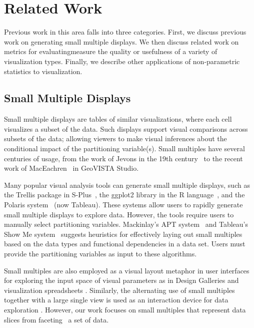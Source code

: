 \section{Related Work}
\label{sec:related}
Previous work in this area falls into three categories. First, we discuss previous work on generating small multiple displays. We then discuss related work on metrics for evaluatingmeasure the quality or usefulness of a variety of visualization types. Finally, we describe other applications of non-parametric statistics to visualization.

\subsection{Small Multiple Displays}
Small multiple displays are tables of similar visualizations, where each cell visualizes a subset of the data. Such displays support visual comparisons across subsets of the data; allowing viewers to make visual inferences about the conditional impact of the partitioning variable(s). Small multiples have several centuries of usage, from the work of Jevons in the 19th century~\cite{Kelley1973} to the recent work of MacEachren~\cite{Maceachren2003} in GeoVISTA Studio.

Many popular visual analysis tools can generate small multiple displays, such as the Trellis package in S-Plus~\cite{Becker1996-manual}, the ggplot2 library in the R language~\cite{Wickham2006}, and the Polaris system~\cite{Stolte2002} (now Tableau). These systems allow users to rapidly generate small multiple displays to explore data. However, the tools require users to manually select partitioning variables. Mackinlay's APT system~\cite{mackinlay1986} and Tableau's Show Me system~\cite{mackinlay2007} suggests heuristics for effectively laying out small multiples based on the data types and functional dependencies in a data set. Users must provide the partitioning variables as input to these algorithms. 


Small multiples are also employed as a visual layout metaphor in user interfaces for exploring the input space of visual parameters as in Design Galleries \cite{marks1997} and visualization spreadsheets \cite{chi1997}. Similarly, the alternating use of small multiples together with a large single view is used as an interaction device for data exploration \cite{van2013}. However, our work focuses on small multiples that represent data slices from faceting~\cite{Wilkinson2005GG} a set of data.

